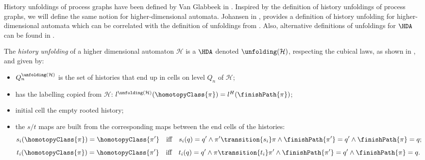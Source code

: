    History unfoldings of process graphs have been defined by Van Glabbeek in \cite[Section 3]{Glabbeek96HistoryUnfolding}. Inspired by the definition of history unfoldings of process graphs, we will define the same notion for higher-dimensional automata. Johansen in \cite{Johansen16STstruct}, provides a definition of history unfolding for higher-dimensional automata which can be correlated with the definition of unfoldings from \cite{Glabbeek96HistoryUnfolding}. Also, alternative definitions of unfoldings for $\HDA$ can be found in \cite{Fahrenberg05PhD, Fahrenberg15PartialHDA}.

    \begin{definition}\label{def_unfolding_history} 
        The \emph{history unfolding} of a higher dimensional automaton $\mathcal{H}$ is a $\HDA$ denoted $\unfolding(\mathcal{H})$, respecting the cubical laws, as shown in \cite[Proposition 3.30]{Johansen16STstruct}, and given by:
        
        \begin{itemize}
            \item $Q_{n}^{\unfolding(\mathcal{H})}$ is the set of histories that end up in cells on level $Q_n$ of $\mathcal{H}$;
            \item has the labelling copied from $\mathcal{H}$: $l^{\unfolding(\mathcal{H})}(\homotopyClass{\pi})=l^{H}(\finishPath{\pi})$;
            \item initial cell the empty rooted history;
            \item the $s/t$ maps are built from the corresponding maps between the end cells of the histories: 
                \[
                    s_{i}(\homotopyClass{\pi})=\homotopyClass{\pi'}\mbox{\ \ \ iff\ \ \ }s_{i}(q)=q'\wedge \pi'\transition{s_{i}}\pi\wedge \finishPath{\pi'}=q'\wedge \finishPath{\pi}=q;
                \]
                \[
                    t_{i}(\homotopyClass{\pi})=\homotopyClass{\pi'} \mbox{\ \ \ iff\ \ \ } t_{i}(q)=q' \wedge \pi\transition{t_{i}}\pi' \wedge \finishPath{\pi'}=q'\wedge \finishPath{\pi}=q.
                \]
        \end{itemize}
    \end{definition}
    
    
